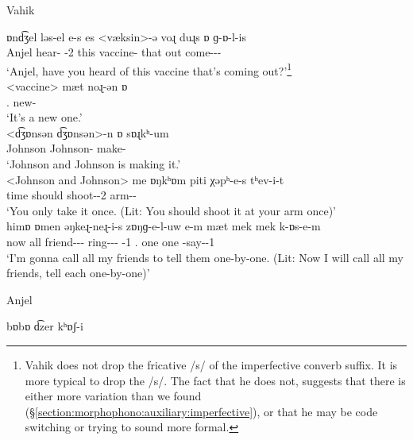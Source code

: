 \begin{exe}
\ex Vahik
	\begin{xlist}
\ex  \gll  ɒnd͡ʒel   ləs-el e-s   es   <væksin>-ə   voɻ   duɻs ɒ   ɡ-ɒ-l-is   \\
 Anjel   hear-{\perfcvb} {\auxgloss}-2{\sg}   this   vaccine-{}   that   out {\auxgloss}   come-{\thgloss}-{\infgloss}-{\impfcvb}  \\
\trans `Anjel, have you heard  of this vaccine that's coming out?'\footnote{Vahik does not drop the fricative /s/ of the imperfective converb suffix. It is more typical to drop the /s/. The fact that he does not, suggests that there is either more variation than we found (\S\ref{section:morphophono:auxiliary:imperfective}), or that he may be code switching or trying to sound more formal.} \\
   <vaccine>
\ex \gll  mæt  noɻ-ən ɒ  \\
 {\indf}.{\cl}   new-{} {\auxgloss}  \\
\trans `It's a new one.'  \\
\ex  \gll <d͡ʒɒnsən d͡ʒɒnsən>-n ɒ   sɒɻkʰ-um \\
 Johnson Johnson-{} {\auxgloss}   make-{\impfcvb}   \\
 \trans `Johnson and Johnson is making it.'  \\
<Johnson and Johnson>
\ex \gll     me   ɒŋkʰɒm  piti   χəpʰ-e-s   tʰev-i-t  \\
 {\indf}   time  should   shoot-{\thgloss}-2{\sg}   arm-{\dat}-{\possSsg}  \\
\trans  `You only take it once. (Lit: You should shoot it at your arm once)'  \\
\ex \gll  himɒ ɒmen   əŋkeɻ-neɻ-i-s   zɒŋɡ-e-l-uw e-m   mæt   mek mek   k-ɒs-e-m  \\
 now all   friend-{\pl}-{\dat}-{\possFsg}   ring-{\thgloss}-{\infgloss}-{\futcvb} {\auxgloss}-1{\sg}   {\indf}.{\cl}   one one   {\fut}-say-{\thgloss}-1{\sg}  \\
 \trans `I’m gonna call all my friends to tell them one-by-one. (Lit: Now I will call all my friends, tell each one-by-one)' \\
\end{xlist}
\ex Anjel
\begin{xlist}
	\ex \gll  bɒbɒ   d͡zer   kʰɒʃ-i \\

\end{xlist}
\end{exe}
